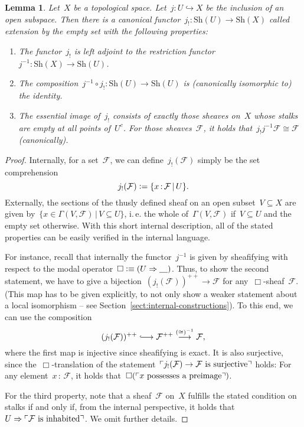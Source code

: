 \documentclass[10pt]{amsart}
\makeatletter
\theoremstyle{definition}
\theoremstyle{plain}
\newtheorem{lemma}[defn]{Lemma}
\theoremstyle{remark}
\newcommand{\F}{\mathcal{F}}
\newcommand{\placeholder}{\underline{\quad}}
\newcommand{\Sh}{\mathrm{Sh}}
\newcommand{\?}{\,{:}\,}
\renewcommand{\_}{\mathpunct{.}\,}
\newcommand{\speak}[1]{\ulcorner\text{\textnormal{#1}}\urcorner}
\newcommand{\lra}{\longrightarrow}
\newcommand{\lhra}{\ensuremath{\lhook\joinrel\relbar\joinrel\rightarrow}}
\newcommand{\ie}{i.\,e.\@\xspace}
\newcommand{\defeq}{\vcentcolon=}
\newcommand{\defequiv}{\vcentcolon\equiv}
\makeatother
\begin{document}
\begin{lemma}\label{lemma:extension-by-empty-set}
Let~$X$ be a topological space. Let~$j : U \hookrightarrow X$ be the inclusion
of an open subspace. Then there is a canonical functor~$j_! : \Sh(U) \to
\Sh(X)$ called \emph{extension by the empty set} with the following properties:
\begin{enumerate}
\item The functor~$j_!$ is left adjoint to the restriction functor~$j^{-1} : \Sh(X) \to
\Sh(U)$.
\item The composition~$j^{-1} \circ j_! : \Sh(U) \to \Sh(U)$ is (canonically
isomorphic to) the identity.
\item The essential image of~$j_!$ consists of exactly those sheaves on~$X$
whose stalks are empty at all points of~$U^c$. For those sheaves~$\F$, it holds
that~$j_!j^{-1}\F \cong \F$ (canonically).
\end{enumerate}
\end{lemma}
\begin{proof}Internally, for a set~$\F$, we can define~$j_!(\F)$ simply be the
set comprehension
\[ j_!(\F) \defeq \{ x\?\F \,|\, U \}. \]
Externally, the sections of the thusly defined sheaf on an open subset~$V
\subseteq X$ are given by~$\{ x \in \Gamma(V,\F) \,|\, V \subseteq U \}$,
\ie the whole of~$\Gamma(V,\F)$ if~$V \subseteq U$ and the empty set otherwise.
With this short internal description, all of the stated properties can be
easily verified in the internal language.

For instance, recall that internally the functor~$j^{-1}$ is given by
sheafifying with respect to the modal operator~$\Box \defequiv (U \Rightarrow
\placeholder)$. Thus, to show the second statement, we have to give a
bijection~$(j_!(\F))^{++} \to \F$ for any~$\Box$-sheaf~$\F$. (This map has to
be given explicitly, to not only show a weaker statement about a local
isomorphism -- see Section~\ref{sect:internal-constructions}). To this end, we can use the composition
\[ (j_!(\F))^{++} \lhra \F^{++} \stackrel{({\cong})^{-1}}{\lra} \F, \]
where the first map is injective since sheafifying is exact. It is also
surjective, since the~$\Box$-translation of the statement~$\speak{$j_!(\F) \to
\F$ is surjective}$ holds: For any element~$x\?\F$, it holds
that~$\Box(\speak{$x$ possesses a preimage})$.

For the third property, note that a sheaf~$\F$ on~$X$ fulfills the stated
condition on stalks if and only if, from the internal perspective, it holds
that~$U \Rightarrow \speak{$\F$ is inhabited}$. We omit further details.
\end{proof}
\end{document}
